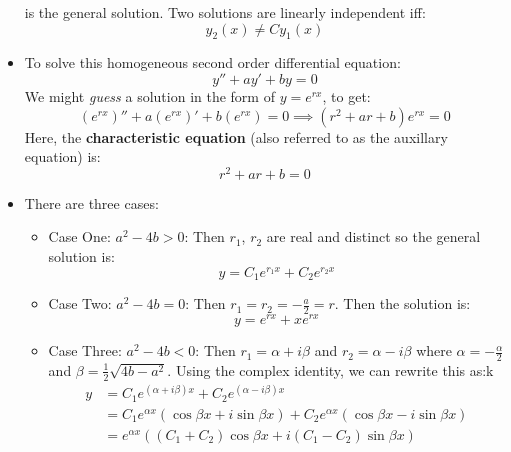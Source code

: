 \begin{itemize}
\begin{theorem}
        is the general solution. Two solutions are linearly independent iff:
        \begin{equation}
            y_2(x) \neq Cy_1(x)
            \label{eq:}
        \end{equation}
    \end{theorem}
    \item To solve this homogeneous second order differential equation:
    \begin{equation}
        y'' + ay' + by = 0
        \label{eq:}
    \end{equation}
    We might \textit{guess} a solution in the form of $y=e^{rx}$, to get:
    \begin{equation}
        (e^{rx})'' + a(e^{rx})' + b(e^{rx}) = 0 \implies (r^2+ar+b)e^{rx}=0
        \label{eq:}
    \end{equation}
    Here, the \textbf{characteristic equation} (also referred to as the auxillary equation) is:
    \begin{equation}
        r^2+ar+b = 0
        \label{eq:}
    \end{equation}
    \item There are three cases:
    \begin{itemize}
        \item Case One: $a^2-4b>0$: Then $r_1$, $r_2$ are real and distinct so the general solution is:
        \begin{equation}
            y=C_1e^{r_1x} + C_2e^{r_2x}
            \label{eq:}
        \end{equation}
        \item Case Two: $a^2-4b=0$: Then $r_1=r_2=-\frac{a}{2}=r$. Then the solution is:
        \begin{equation}
            y = e^{rx} + xe^{rx}
            \label{eq:}
        \end{equation}
        \item Case Three: $a^2-4b<0$: Then $r_1=\alpha+i\beta$ and $r_2=\alpha-i\beta$ where $\alpha=-\frac{\alpha}{2}$ and $\beta=\frac{1}{2}\sqrt{4b-a^2}$. Using the complex identity, we can rewrite this as:k
        \begin{align}
            y&=C_1e^{(\alpha+i\beta)x}+C_2e^{(\alpha-i\beta)x} \\ 
            &= C_1e^{\alpha x}\left(\cos\beta x + i\sin\beta x\right) + C_2e^{\alpha x}(\cos\beta x-i\sin \beta x) \\ 
            &= e^{\alpha x}\left((C_1+C_2)\cos\beta x + i(C_1-C_2)\sin\beta x\right) \\ 

\end{align}
\end{itemize}
\end{itemize}
